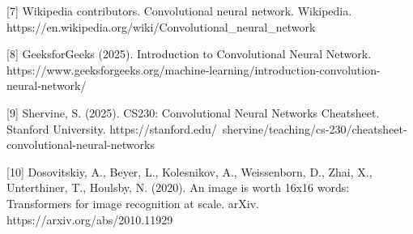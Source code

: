 \documentclass[conference]{IEEEtran}
\begin{document}
[7] Wikipedia contributors. Convolutional neural network. Wikipedia.
https://en.wikipedia.org/wiki/Convolutional\_neural\_network

[8] GeeksforGeeks (2025). Introduction to Convolutional Neural Network.
https://www.geeksforgeeks.org/machine-learning/introduction-convolution-neural-network/

[9] Shervine, S. (2025). CS230: Convolutional Neural Networks Cheatsheet. Stanford University.
https://stanford.edu/~shervine/teaching/cs-230/cheatsheet-convolutional-neural-networks

[10] Dosovitskiy, A., Beyer, L., Kolesnikov, A., Weissenborn, D., Zhai, X., Unterthiner, T., Houlsby, N. (2020).
An image is worth 16x16 words: Transformers for image recognition at scale. arXiv.
https://arxiv.org/abs/2010.11929





\end{document}

